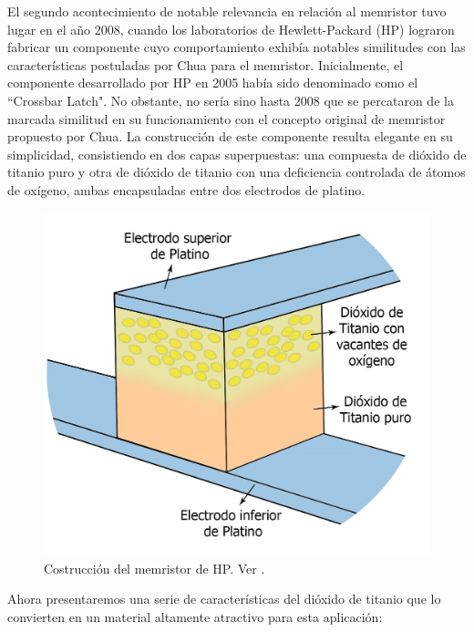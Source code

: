 \documentclass[12pt,a4paper]{report} %
\begin{document}
	
	
	\newpage
	
	\noindent El segundo acontecimiento de notable relevancia en relación al memristor tuvo lugar en el año 2008, cuando los laboratorios de Hewlett-Packard (HP) lograron fabricar un componente cuyo comportamiento exhibía notables similitudes con las características postuladas por Chua para el memristor. Inicialmente, el componente desarrollado por HP en 2005 había sido denominado como el ``Crossbar Latch". No obstante, no sería sino hasta 2008 que se percataron de la marcada similitud en su funcionamiento con el concepto original de memristor propuesto por Chua. La construcción de este componente resulta elegante en su simplicidad, consistiendo en dos capas superpuestas: una compuesta de dióxido de titanio puro y otra de dióxido de titanio con una deficiencia controlada de átomos de oxígeno, ambas encapsuladas entre dos electrodos de platino. 
	
\vspace{0.5cm}\begin{figure}[h]
		\centering
		\includegraphics[width=1\textwidth]{mem1.jpg}
		\caption{Costrucción del memristor de HP. Ver \cite{williams}.}
		\label{fig:mem1}
	\end{figure}
	
	\newpage
	
	Ahora presentaremos una serie de características del dióxido de titanio que lo convierten en un material altamente atractivo para esta aplicación:
	
\end{document}
